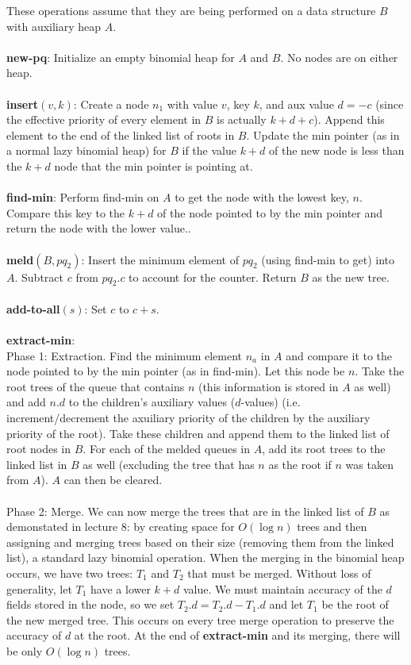 \documentclass{article}
\theoremstyle{casestyle}
\begin{document}
These operations assume that they are being performed on a data structure $B$ with auxiliary heap $A$.\\\\
\textbf{new-pq}: Initialize an empty binomial heap for $A$ and $B$. No nodes are on either heap. \\\\
\textbf{insert}$(v,k)$: Create a node $n_1$ with value $v$, key $k$, and aux value $d=-c$ (since the effective priority of every element in $B$ is actually $k+d+c$). Append this element to the end of the linked list of roots in $B$. Update the min pointer (as in a normal lazy binomial heap) for $B$ if the value $k+d$ of the new node is less than the $k+d$ node that the min pointer is pointing at.\\\\
\textbf{find-min}: Perform find-min on $A$ to get the node with the lowest key, $n$. Compare this key to the $k+d$ of the node pointed to by the min pointer and return the node with the lower value..\\\\
\textbf{meld}$(B,pq_2)$: Insert the minimum element of $pq_2$ (using find-min to get) into $A$. Subtract $c$ from $pq_2.c$ to account for the counter. Return $B$ as the new tree.\\\\
\textbf{add-to-all}$(s)$: Set $c$ to $c + s$.  \\\\
\textbf{extract-min}: \\ Phase 1: Extraction. Find the minimum element $n_a$ in $A$ and compare it to the node pointed to by the min pointer (as in find-min). Let this node be $n$. Take the root trees of the queue that contains $n$ (this information is stored in $A$ as well) and add $n.d$ to the children's auxiliary values ($d$-values) (i.e. increment/decrement the axuiliary priority of the children by the auxiliary priority of the root). Take these children and append them to the linked list of root nodes in $B$. For each of the melded queues in $A$, add its root trees to the linked list in $B$ as well (excluding the tree that has $n$ as the root if $n$ was taken from $A$). $A$ can then be cleared. \\\\ Phase 2: Merge. We can now merge the trees that are in the linked list of $B$ as demonstated in lecture 8: by creating space for $O(\log n)$ trees and then assigning and merging trees based on their size (removing them from the linked list), a standard lazy binomial operation. When the merging in the binomial heap occurs, we have two trees: $T_1$ and $T_2$ that must be merged. Without loss of generality, let $T_1$ have a lower $k+d$ value. We must maintain accuracy of the $d$ fields stored in the node, so we set $T_2.d = T_2.d - T_1.d$ and let $T_1$ be the root of the new merged tree. This occurs on every tree merge operation to preserve the accuracy of $d$ at the root. At the end of \textbf{extract-min} and its merging, there will be only $O(\log n)$ trees.\\
\end{document}
